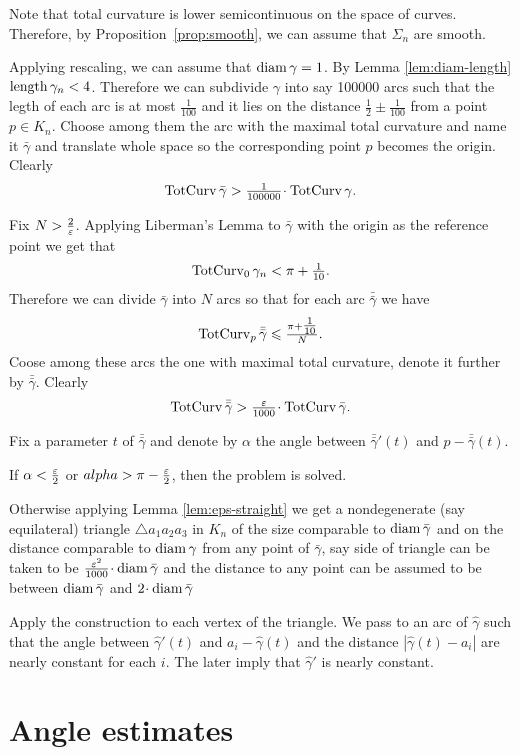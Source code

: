 \documentclass[a4paper,10pt]{amsart}
\begin{document}
Note that total curvature is lower semicontinuous on the space of curves.
Therefore, by Proposition~\ref{prop:smooth}, we can assume that $\Sigma_n$ are smooth.

Applying rescaling, we can assume that $\operatorname{diam}\gamma=1$.
By Lemma \ref{lem:diam-length} $\length\gamma_n\zz<4$.
Therefore we can subdivide $\gamma$ into say 100000 arcs
such that the legth of each arc is at most $\tfrac1{100}$
and it lies on the distance $\tfrac12\pm \tfrac1{100}$ 
from a point $p\in K_n$.
Choose among them the arc with the maximal total curvature and 
name it $\bar\gamma$ and translate whole space so the corresponding point $p$ becomes the origin.
Clearly
\[\tc\bar\gamma>\tfrac1{100000}\cdot \tc\gamma.\]

Fix $N>\tfrac2{\varepsilon}$.
Applying Liberman's Lemma to $\bar\gamma$ with the origin as the reference point 
we get that \[\mathop{\rm TotCurv}\nolimits_0\gamma_n<\pi+\tfrac1{10}.\]
Therefore we can divide $\bar\gamma$ into $N$ arcs 
so that for each arc $\bar{\bar\gamma}$
we have \[\mathop{\rm TotCurv}\nolimits_p\bar{\bar\gamma}\leqslant \tfrac{\pi+\tfrac1{10}}{N}.\]
Coose among these arcs the one with maximal total curvature,
denote it further by $\bar{\bar\gamma}$.
Clearly 
\[\tc\bar{\bar\gamma}>\tfrac\eps{1000}\cdot \tc\bar\gamma.\]

Fix a parameter $t$ of $\bar{\bar\gamma}$
and denote by $\alpha$ the angle between $\bar{\bar\gamma}'(t)$ and $p-\bar{\bar\gamma}(t)$.

If $\alpha<\tfrac{\varepsilon}2$ or $alpha>\pi-\tfrac{\varepsilon}2$,
then the problem is solved.

Otherwise 
applying Lemma \ref{lem:eps-straight} we get a nondegenerate (say equilateral) 
triangle $\triangle a_1a_2a_3$ in $K_n$ 
of the size comparable to $\operatorname{diam} \bar\gamma$ 
and on the distance comparable to $\operatorname{diam} \gamma$ from any point of $\bar\gamma$,
say side of triangle can be taken to be $\tfrac{\eps^2}{1000}\cdot\diam \bar\gamma$
and the distance to any point can be assumed to be between $\operatorname{diam} \bar\gamma$ and $2\cdot \diam \bar\gamma$

Apply the construction to each vertex of the triangle.
We pass to an arc of $\hat\gamma$
such that the angle between $\hat\gamma'(t)$ and $a_i-\hat\gamma(t)$ 
and the distance $|\hat\gamma(t)-a_i|$
are nearly constant for each $i$.
The later imply that $\hat\gamma'$ is nearly constant.
\qeds


\section{Angle estimates}
\end{document}
